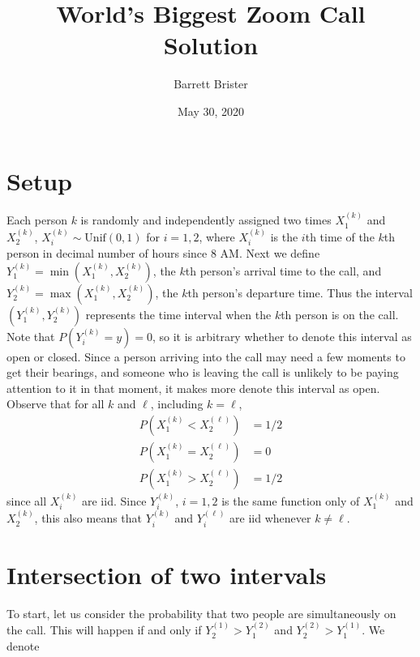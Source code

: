 \documentclass[]{article}
\title{World's Biggest Zoom Call Solution}
\author{Barrett Brister}
\date{May 30, 2020}
\begin{document}
\maketitle
\section{Setup}
Each person $k$ is randomly and independently assigned two times $X_1^{(k)}$ and $X_2^{(k)}$, $X_i^{(k)} \sim \text{Unif}(0,1)$ for $i = 1,2$, where $X_i^{(k)}$ is the $i$th time of the $k$th person in decimal number of hours since 8 AM. Next we define $Y_1^{(k)} = \min(X_1^{(k)}, X_2^{(k)})$, the $k$th person's arrival time to the call, and $Y_2^{(k)} = \max(X_1^{(k)}, X_2^{(k)})$, the $k$th person's departure time. Thus the interval $(Y_1^{(k)}, Y_2^{(k)})$ represents the time interval when the $k$th person is on the call. Note that $P(Y_i^{(k)} = y) = 0$, so it is arbitrary whether to denote this interval as open or closed. Since a person arriving into the call may need a few moments to get their bearings, and someone who is leaving the call is unlikely to be paying attention to it in that moment, it makes more denote this interval as open. Observe that for all $k$ and $\ell$, including $k = \ell$,
\begin{align}
P(X_1^{(k)} < X_2^{(\ell)}) &= 1/2 \nonumber\\
P(X_1^{(k)} = X_2^{(\ell)}) &= 0 \nonumber\\
P(X_1^{(k)} > X_2^{(\ell)}) &= 1/2
\end{align}
since all $X_i^{(k)}$ are iid. Since $Y_i^{(k)}$, $i = 1,2$ is the same function only of $X_1^{(k)}$ and $X_2^{(k)}$, this also means that $Y_i^{(k)}$ and $Y_i^{(\ell)}$ are iid whenever $k \neq\ell$.

\section{Intersection of two intervals}
To start, let us consider the probability that two people are simultaneously on the call. This will happen if and only if $Y_2^{(1)} > Y_1^{(2)}$ and $Y_2^{(2)} > Y_1^{(1)}$. We denote
\end{document}
